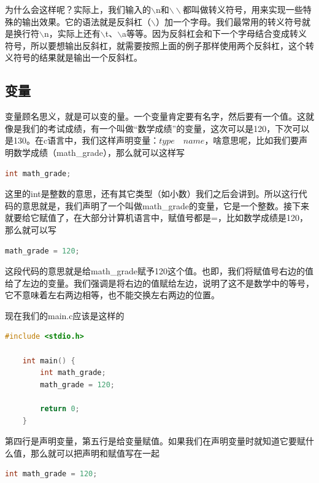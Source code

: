 为什么会这样呢？实际上，我们输入的$\backslash$n和$\backslash{}\backslash$都叫做转义符号，用来实现一些特殊的输出效果。它的语法就是反斜杠（$\backslash$）加一个字母。我们最常用的转义符号就是换行符$\backslash$n，实际上还有$\backslash$t、$\backslash$a等等。因为反斜杠会和下一个字母结合变成转义符号，所以要想输出反斜杠，就需要按照上面的例子那样使用两个反斜杠，这个转义符号的结果就是输出一个反斜杠。

\subsection{变量}

变量顾名思义，就是可以变的量。一个变量肯定要有名字，然后要有一个值。这就像是我们的考试成绩，有一个叫做“数学成绩”的变量，这次可以是120，下次可以是130。在c语言中，我们这样声明变量：$type\quad{}name$，啥意思呢，比如我们要声明数学成绩（math\_grade），那么就可以这样写

\begin{lstlisting}[language=C]
    int math_grade; 
\end{lstlisting}

这里的int是整数的意思，还有其它类型（如小数）我们之后会讲到。所以这行代码的意思就是，我们声明了一个叫做math\_grade的变量，它是一个整数。接下来就要给它赋值了，在大部分计算机语言中，赋值号都是=，比如数学成绩是120，那么就可以写

\begin{lstlisting}[language=C]
    math_grade = 120;
\end{lstlisting}

这段代码的意思就是给math\_grade赋予120这个值。也即，我们将赋值号右边的值给了左边的变量。我们强调是将右边的值赋给左边，说明了这不是数学中的等号，它不意味着左右两边相等，也不能交换左右两边的位置。

现在我们的main.c应该是这样的

\begin{lstlisting}[language=C]
    #include <stdio.h>

    int main() {
        int math_grade;
        math_grade = 120;

        return 0;
    }
\end{lstlisting}

第四行是声明变量，第五行是给变量赋值。如果我们在声明变量时就知道它要赋什么值，那么就可以把声明和赋值写在一起

\begin{lstlisting}[language=C]
    int math_grade = 120;
\end{lstlisting}

